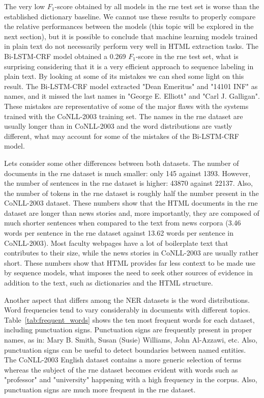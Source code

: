 \documentclass{nle}
\begin{document}
The very low $ F_1 $-score obtained by all models in the \gls{rne} test set is worse than the established
dictionary baseline. We cannot use these results to properly compare the relative performances 
between the models (this topic will be explored in the next section), but it is possible to conclude
that machine learning models trained in plain text do not necessarily perform very well in HTML 
extraction tasks. The Bi-LSTM-CRF model obtained a 0.269 $ F_1 $-score in the \gls{rne} test
set, what is surprising considering that it is a very efficient approach to sequence labeling in plain 
text. By looking at some of its mistakes we can shed some light on this result. The Bi-LSTM-CRF model
extracted "Dean Emeritus" and "14101 INF" as names, and it missed the last names in "George E. Elliott"
and "Carl J. Galligan". These mistakes are representative of some of the major flaws with the systems
trained with the CoNLL-2003 training set. The names in the \gls{rne} dataset 
are usually longer than in CoNLL-2003 and the word distributions are vastly different, what may
account for some of the mistakes of the Bi-LSTM-CRF model.

Lets consider some other differences between both datasets. 
The number of documents in the \gls{rne} dataset is much smaller: only 145 against 
1393. However, the number of sentences in the \gls{rne}
dataset is higher: 43870 against 22137. Also, the number of tokens in the \gls{rne} dataset
is roughly half the number present in the {CoNLL-2003} dataset. These numbers show that 
the HTML documents in the \gls{rne} dataset are longer than news 
stories and, more importantly, they are composed of much shorter sentences when compared 
to the text from news corpora (3.46 words per sentence in the \gls{rne} dataset
against 13.62 words per sentence in {CoNLL-2003}). Most faculty webpages have a lot of 
boilerplate text that contributes to their size, while the news stories in {CoNLL-2003}
are usually rather short. These numbers show that HTML provides far less context to be made 
use by sequence models, what imposes the need to seek other sources of evidence in addition to 
the text, such as dictionaries and the HTML structure.

Another aspect that differs among the NER datasets is the word distributions. Word frequencies
tend to vary considerably in documents with different topics. Table~\ref{tab:frequent_words}
shows the ten most frequent words for each dataset, including punctuation signs. Punctuation
signs are frequently present in proper names, as in: Mary B. Smith, Susan (Susie) Williams, John Al-Azzawi, etc.
Also, punctuation signs can be useful to detect boundaries between named entities.
The {CoNLL-2003} English dataset contains a more generic selection of terms whereas the 
subject of the \gls{rne} dataset becomes evident with words such as "professor" and "university" 
happening with a high frequency in the corpus. Also, punctuation signs are much more frequent in
the \gls{rne} dataset. 
\end{document}
